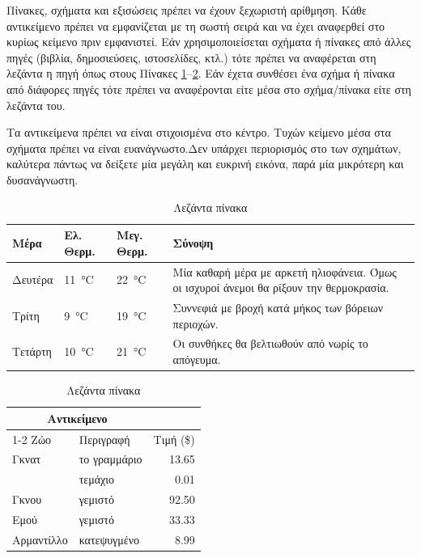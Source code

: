 \documentclass[a4paper,oneside,12pt]{book}
\begin{document}
Πίνακες, σχήματα και εξισώσεις πρέπει να έχουν ξεχωριστή αρίθμηση. Κάθε αντικείμενο πρέπει να εμφανίζεται με τη σωστή σειρά και να έχει αναφερθεί στο κυρίως κείμενο πριν εμφανιστεί. Εάν χρησιμοποιείσεται σχήματα ή πίνακες από άλλες πηγές (βιβλία, δημοσιεύσεις, ιστοσελίδες, κτλ.) τότε πρέπει να αναφέρεται στη λεζάντα η πηγή όπως στους Πίνακες \ref{tab:my_label}--\ref{tab:my_label2}. Εάν έχετα συνθέσει ένα σχήμα ή πίνακα από διάφορες πηγές τότε πρέπει να αναφέρονται είτε μέσα στο σχήμα/πίνακα είτε στη λεζάντα του.

Τα αντικείμενα πρέπει να είναι στιχοισμένα στο κέντρο. Τυχών κείμενο μέσα στα σχήματα πρέπει να είναι ευανάγνωστο.Δεν υπάρχει περιορισμός στο των σχημάτων, καλύτερα πάντως να δείξετε μία μεγάλη και ευκρινή εικόνα, παρά μία μικρότερη και δυσανάγνωστη.


\begin{table}[htb]
    \centering
    \begin{tabular}{l l l p{5cm}}
    \toprule
    Μέρα & Ελ. Θερμ. & Μεγ. Θερμ. & Σύνοψη \\ \midrule
    Δευτέρα & \SI{11}{\celsius} & \SI{22}{\celsius} & Μία καθαρή μέρα με αρκετή ηλιοφάνεια. Όμως οι ισχυροί άνεμοι θα ρίξουν την θερμοκρασία. \\ \midrule
    Τρίτη & \SI{9}{\celsius} & \SI{19}{\celsius}  & Συννεφιά με βροχή κατά μήκος των βόρειων περιοχών. \\ \midrule
    Τετάρτη & \SI{10}{\celsius}  & \SI{21}{\celsius}  & Οι συνθήκες θα βελτιωθούν από νωρίς το απόγευμα. \\
    \bottomrule
    \end{tabular}
    \caption{Λεζάντα πίνακα \cite{website:table}}
    \label{tab:my_label}
\end{table}

\begin{table}[htb]
    \centering
\begin{tabular}{llr}  
\toprule
\multicolumn{2}{c}{Αντικείμενο} \\
\cmidrule(r){1-2}
Ζώο    & Περιγραφή & Τιμή (\$) \\
\midrule
Γκνατ      & το γραμμάριο    & 13.65      \\
          &    τεμάχιο     & 0.01       \\
Γκνου       & γεμιστό     & 92.50      \\
Εμού     & γεμιστό     & 33.33      \\
Αρμαντίλλο & κατεψυγμένο      & 8.99       \\
\bottomrule
\end{tabular}
    \caption{Λεζάντα πίνακα \cite{website:table}}
    \label{tab:my_label2}
\end{table}
\end{document}
